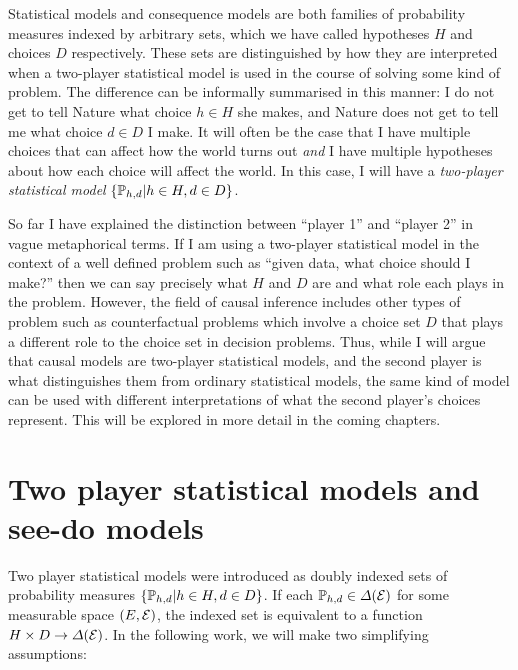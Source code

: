 Statistical models and consequence models are both families of probability measures indexed by arbitrary sets, which we have called hypotheses $H$ and choices $D$ respectively. These sets are distinguished by how they are interpreted when a two-player statistical model is used in the course of solving some kind of problem. The difference can be informally summarised in this manner: I do not get to tell Nature what choice $h\in H$ she makes, and Nature does not get to tell me what choice $d\in D$ I make. It will often be the case that I have multiple choices that can affect how the world turns out \emph{and} I have multiple hypotheses about how each choice will affect the world. In this case, I will have a \emph{two-player statistical model} $\{\mathbb{P}_{h,d}|h\in H,d\in D\}$. 

So far I have explained the distinction between ``player 1'' and ``player 2'' in vague metaphorical terms. If I am using a two-player statistical model in the context of a well defined problem such as ``given data, what choice should I make?'' then we can say precisely what $H$ and $D$ are and what role each plays in the problem. However, the field of causal inference includes other types of problem such as counterfactual problems which involve a choice set $D$ that plays a different role to the choice set in decision problems. Thus, while I will argue that causal models are two-player statistical models, and the second player is what distinguishes them from ordinary statistical models, the same kind of model can be used with different interpretations of what the second player's choices represent. This will be explored in more detail in the coming chapters.


\section{Two player statistical models and see-do models}

Two player statistical models were introduced as doubly indexed sets of probability measures $\{\mathbb{P}_{h,d}|h\in H,d\in D\}$. If each $\mathbb{P}_{h,d}\in \Delta(\mathcal{E})$ for some measurable space $(E,\mathcal{E})$, the indexed set is equivalent to a function $H\times D\to \Delta(\mathcal{E})$. In the following work, we will make two simplifying assumptions:

